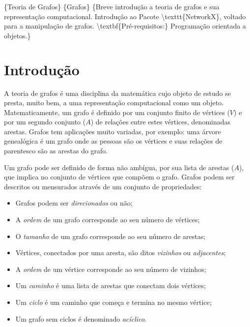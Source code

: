 \documentclass[a4paper,10pt,brazil]{sphinxmanual}
\begin{document}
\{Teoria de Grafos\} \{Grafos\}
\{Breve introdução a teoria de grafos e sua representação computacional. Introdução ao Pacote \textbackslash{}texttt\{NetworkX\}, voltado para a manipulação de grafos.
\textbackslash{}textbf\{Pré-requisitos:\} Programação orientada a objetos.\}


\chapter{Introdução}
\label{capgraph:introducao}\label{capgraph::doc}
A teoria de grafos é uma disciplina da matemática cujo objeto de
estudo se presta, muito bem, a uma representação computacional como
um objeto. Matematicamente, um grafo é definido por um conjunto
finito de vértices ($V$) e por um segundo conjunto
($A$) de relações entre estes vértices, denominadas
arestas. Grafos tem aplicações muito variadas, por exemplo: uma
árvore genealógica é um grafo onde as pessoas são os vértices e
suas relações de parentesco são as arestas do grafo.

Um grafo pode ser definido de forma não ambígua, por sua lista de
arestas ($A$), que implica no conjunto de vértices que
compõem o grafo. Grafos podem ser descritos ou mensurados através
de um conjunto de propriedades:
\begin{itemize}
\item {} 
Grafos podem ser \emph{direcionados} ou não;

\item {} 
A \emph{ordem} de um grafo corresponde ao seu número de vértices;

\item {} 
O \emph{tamanho} de um grafo corresponde ao seu número de arestas;

\item {} 
Vértices, conectados por uma aresta, são ditos \emph{vizinhos} ou
\emph{adjacentes};

\item {} 
A \emph{ordem} de um vértice corresponde ao seu número de vizinhos;

\item {} 
Um \emph{caminho} é uma lista de arestas que conectam dois vértices;

\item {} 
Um \emph{ciclo} é um caminho que começa e termina no mesmo vértice;

\item {} 
Um grafo sem ciclos é denominado \emph{acíclico}.

\end{itemize}
\end{document}
